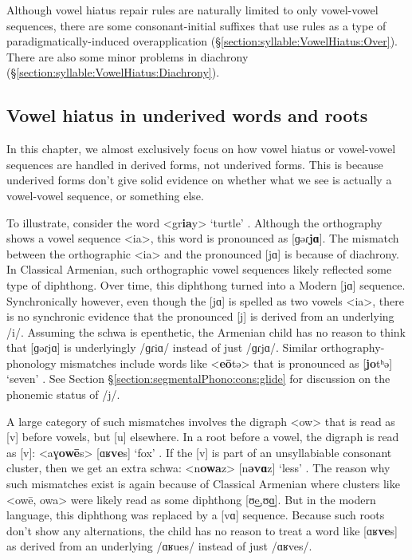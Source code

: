 {	Although vowel hiatus repair rules are naturally limited to only vowel-vowel sequences, there are some consonant-initial suffixes  that   use rules as a type of paradigmatically-induced overapplication (\S\ref{section:syllable:VowelHiatus:Over}). There are also some minor problems in diachrony (\S\ref{section:syllable:VowelHiatus:Diachrony}). 
	
	
	
	
	
	\subsection{Vowel hiatus in underived words and roots}\label{section:syllable:VowelHiatus:Root}
	In this chapter, we almost exclusively focus on how vowel hiatus or vowel-vowel sequences are handled in derived forms, not underived forms. This is because underived forms don't give solid evidence on whether what we see is actually a vowel-vowel sequence, or something else. 
	
	
	To illustrate, consider the word <gr\textbf{ia}y> `turtle' . Although the orthography shows a vowel sequence <ia>, this word is pronounced as [ɡəɾ\textbf{jɑ}]. The mismatch between the orthographic <ia> and the pronounced [jɑ] is because of diachrony. In Classical Armenian, such orthographic vowel sequences likely reflected some type of diphthong. Over time, this diphthong turned into a Modern [jɑ] sequence. Synchronically however, even though the [jɑ] is spelled as two vowels <ia>, there is  no synchronic evidence that the pronounced [j] is derived from an underlying /i/.  Assuming the schwa is epenthetic,   the Armenian child has no reason to think that [ɡəɾjɑ] is underlyingly /ɡɾiɑ/ instead of just /ɡɾjɑ/.  Similar orthography-phonology mismatches include words like <\textbf{eō}tə>  that is pronounced as [\textbf{jo}tʰə]  `seven' . See Section \S\ref{section:segmentalPhono:cons:glide} for discussion on the phonemic status of /j/. 
	
	A large category of such mismatches involves the digraph <ow>  that is read as [v] before vowels, but [u] elsewhere. In a root before a vowel, the digraph is read as [v]: <aɣ\textbf{owē}s> [ɑʁ\textbf{ve}s] `fox' .  If the [v] is part of an unsyllabiable consonant  cluster, then we get an extra schwa: <n\textbf{owa}z> [n\textbf{əvɑ}z] `less' .  The reason why such mismatches exist is again because of Classical Armenian where  clusters like <owē, owa> were   likely read as some diphthong [ʊ͜e,ʊ͜ɑ]. But in the modern language, this diphthong was replaced by a [vɑ] sequence. Because such roots don't show any alternations, the child has no reason to treat a word like   [ɑʁ\textbf{ve}s] as derived from an underlying /ɑʁues/ instead of just /ɑʁves/. 
	
}
